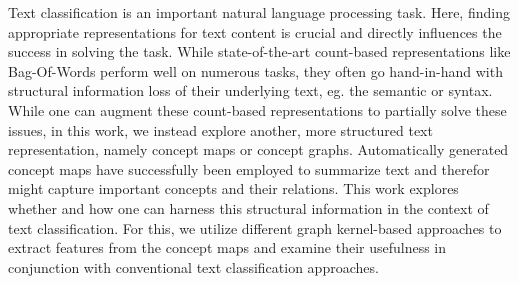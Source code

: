 Text classification is an important natural language processing task. 
Here, finding appropriate representations for text content is crucial and directly influences the success in solving the task.
While state-of-the-art count-based representations like Bag-Of-Words perform well on numerous tasks, they often go hand-in-hand with structural information loss of their underlying text, eg. the semantic or syntax.
While one can augment these count-based representations to partially solve these issues, in this work, we instead explore another, more structured text representation, namely concept maps or concept graphs.
Automatically generated concept maps have successfully been employed to summarize text and therefor might capture important concepts and their relations.
This work explores whether and how one can harness this structural information in the context of text classification.
For this, we utilize different graph kernel-based approaches to extract features from the concept maps and examine their usefulness in conjunction with conventional text classification approaches.